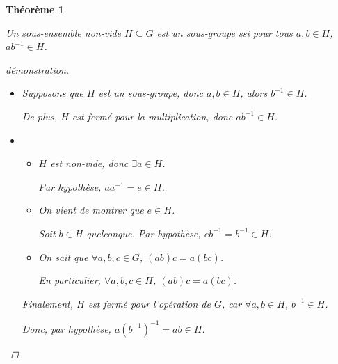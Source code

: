 \documentclass{report}
\newtheorem*{thm}{Th\'eor\`eme}
\theoremstyle{definition}
\theoremstyle{remark}
\begin{document}
	\begin{thm}~

		Un sous-ensemble non-vide $H \subseteq G$ est un sous-groupe ssi pour tous $a,b \in H$, $ab^{-1} \in H$.
		\begin{proof}[d\'emonstration]~

			\begin{itemize}
				\item[$(\Rightarrow)$] Supposons que $H$ est un sous-groupe, donc $a,b \in H$, alors $b^{-1} \in H$.

				De plus, $H$ est ferm\'e pour la multiplication, donc $ab^{-1} \in H$.
				\item[$(\Leftarrow)$]
				\begin{itemize}
					\item[$(N)$] $H$ est non-vide, donc $\exists a \in H$.

					Par hypoth\`ese, $aa^{-1}=e \in H$.
					\item[$(I)$] On vient de montrer que $e \in H$.

					Soit $b \in H$ quelconque. Par hypoth\`ese, $eb^{-1}=b^{-1} \in H$.
					\item[$(A)$] On sait que $\forall a,b,c \in G$, $(ab)c=a(bc)$.

					En particulier, $\forall a,b,c \in H$, $(ab)c=a(bc)$.
				\end{itemize}

				Finalement, $H$ est ferm\'e pour l'op\'eration de $G$, car $\forall a,b \in H$, $b^{-1} \in H$.

				Donc, par hypoth\`ese, $a(b^{-1})^{-1}=ab \in H$.
			\end{itemize}
		\end{proof}
	\end{thm}
\end{document}
